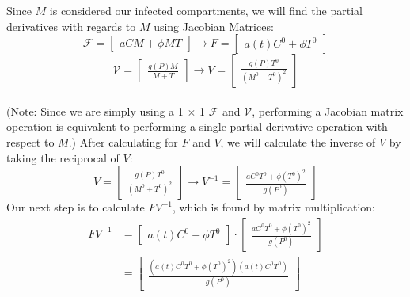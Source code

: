 \documentclass[12pt]{article}
\begin{document}
        Since $M$ is considered our infected compartments, we will find the partial derivatives with regards to $M$ using Jacobian Matrices:
        $$\mathscr{F} = \begin{bmatrix}
                            aCM + \phi MT
                        \end{bmatrix}
            \longrightarrow
            F = \begin{bmatrix}
                a(t)C^{0} + \phi T^{0}
            \end{bmatrix}
        $$
        $$\mathscr{V} = \begin{bmatrix}
                            \frac{g(P)M}{M+T}
                        \end{bmatrix}
                        \longrightarrow
          V = \begin{bmatrix}
                \frac{g(P)T^{0}}{(M^{0}+T^{0})^{2}}
              \end{bmatrix}
        $$\\
        (Note: Since we are simply using a 1 $\times$ 1 $\mathscr{F}$ and $\mathscr{V}$, performing a Jacobian matrix operation is equivalent to performing a single partial derivative operation with respect to $M$.)
        After calculating for $F$ and $V$, we will calculate the inverse of $V$ by taking the reciprocal of $V$:
        $$V = \begin{bmatrix}
                \frac{g(P)T^{0}}{(M^{0}+T^{0})^{2}}
              \end{bmatrix}
          \longrightarrow
          V^{-1} = \begin{bmatrix}
                    \frac{aC^{0}T^{0} + \phi (T^{0})^{2}}{g(P^{0})}
                  \end{bmatrix}
        $$
        Our next step is to calculate $FV^{-1}$, which is found by matrix multiplication:
        \begin{align*}
            FV^{-1} &=\begin{bmatrix}
                            a(t)C^{0} + \phi T^{0}
                        \end{bmatrix}
                        \cdot
                        \begin{bmatrix}
                            \frac{aC^{0}T^{0} + \phi (T^{0})^{2}}{g(P^{0})}
                        \end{bmatrix} 
                    \\
                    &= \begin{bmatrix}
                            \frac{(a(t)C^{0}T^{0}+\phi (T^{0})^{2})(a(t)C^{0}T^{0})}{g(P^{0})}
                        \end{bmatrix}
        \end{align*}
        
\end{document}
